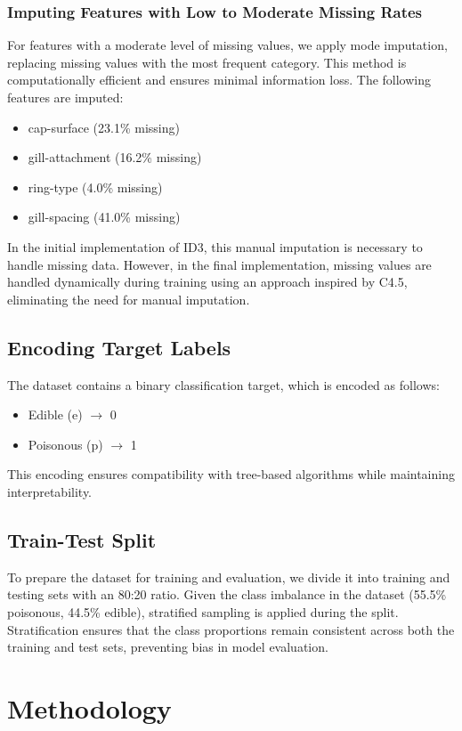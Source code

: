 \documentclass[12pt]{article}
\begin{document}
\subsubsection{Imputing Features with Low to Moderate Missing Rates}
For features with a moderate level of missing values, we apply mode imputation, replacing missing values with the most frequent category. This method is computationally efficient and ensures minimal information loss. The following features are imputed:
\begin{itemize}
    \item cap-surface (23.1\% missing)
    \item gill-attachment (16.2\% missing)
    \item ring-type (4.0\% missing)
    \item gill-spacing (41.0\% missing)
\end{itemize}

In the initial implementation of ID3, this manual imputation is necessary to handle missing data. However, in the final implementation, missing values are handled dynamically during training using an approach inspired by C4.5, eliminating the need for manual imputation.

\subsection{Encoding Target Labels}
The dataset contains a binary classification target, which is encoded as follows:
\begin{itemize}
    \item Edible (e) $\rightarrow$ 0
    \item Poisonous (p) $\rightarrow$ 1
\end{itemize}
This encoding ensures compatibility with tree-based algorithms while maintaining interpretability.

\subsection{Train-Test Split}
To prepare the dataset for training and evaluation, we divide it into training and testing sets with an 80:20 ratio. Given the class imbalance in the dataset (55.5\% poisonous, 44.5\% edible), stratified sampling is applied during the split. Stratification ensures that the class proportions remain consistent across both the training and test sets, preventing bias in model evaluation.


\section{Methodology}
\end{document}
